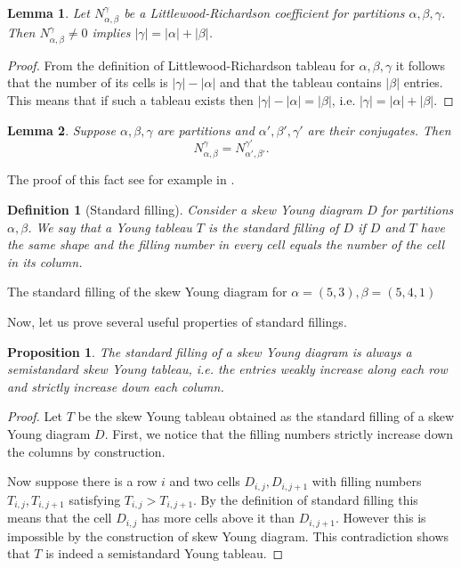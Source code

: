 \documentclass[letterpaper,11pt]{article}
\newtheorem{definition}{Definition}
\newtheorem{lemma}{Lemma}
\newtheorem{proposition}{Proposition}
\begin{document}
	\begin{lemma}
		Let $N_{\alpha, \beta}^\gamma$ be a Littlewood-Richardson coefficient for partitions $\alpha, \beta, \gamma$. Then $N_{\alpha, \beta}^\gamma \not = 0$ implies $|\gamma|=|\alpha| + |\beta|$.
	\end{lemma}
	\begin{proof}
		From the definition of Littlewood-Richardson tableau for $\alpha, \beta, \gamma$ it follows that the number of its cells is $|\gamma| - |\alpha|$ and that the tableau contains $|\beta|$ entries. This means that if such a tableau exists then $|\gamma| - |\alpha| = |\beta|$, i.e. $|\gamma|=|\alpha| + |\beta|$.
	\end{proof}

	\begin{lemma}
		Suppose $\alpha, \beta, \gamma$ are partitions and $\alpha', \beta', \gamma'$ are their conjugates. Then $$N_{\alpha, \beta}^\gamma = N_{\alpha', \beta'}^{\gamma'}.$$
	\end{lemma}
	The proof of this fact see for example in \cite{conjugate}.

	\begin{definition}[Standard filling]
	Consider a skew Young diagram $D$ for partitions $\alpha, \beta$. We say that a Young tableau $T$ is the standard filling of $D$ if $D$ and $T$ have the same shape and the filling number in every cell equals the number of the cell in its column.
	\end{definition}

{
	 \newline
	The standard filling of the skew Young diagram for $\alpha = (5,3), \beta=(5,4,1)$ \newline\par
}

	
	Now, let us prove several useful properties of standard fillings.
	
	\begin{proposition}
		The standard filling of a skew Young diagram is always a semistandard skew Young tableau, i.e. the entries weakly increase along each row and strictly increase down each column.
	\end{proposition}
	\begin{proof}
		Let $T$ be the skew Young tableau obtained as the standard filling of a skew Young diagram $D$.
		First, we notice that the filling numbers strictly increase down the columns by construction. 
		
		Now suppose there is a row $i$ and two cells $D_{i, j}, D_{i, j + 1}$ with filling numbers $T_{i, j},T_{i, j + 1}$ satisfying $T_{i, j} > T_{i, j + 1}$. By the definition of standard filling this means that the cell $D_{i, j}$ has more cells above it than $D_{i, j + 1}$. However this is impossible by the construction of skew Young diagram. This contradiction shows that $T$ is indeed a semistandard Young tableau.
	\end{proof}
\end{document}
